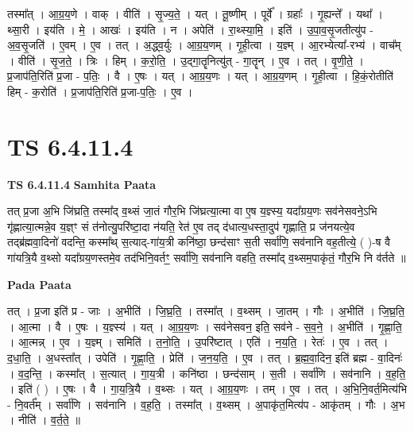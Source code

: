 \documentclass[17pt]{extarticle}
\begin{document}
तस्मा᳚त् । आ॒ग्र॒य॒णे । वाक् । वीति॑ । सृ॒ज्य॒ते॒ । यत् । तू॒ष्णीम् । पूर्वे᳚ । ग्रहाः᳚ । गृ॒ह्यन्ते᳚ । यथा᳚ । थ्सा॒री । इय॑ति । मे॒ । आखः॑ । इय॑ति । न । अपेति॑ । रा॒थ्स्या॒मि॒ । इति॑ । उ॒पा॒व॒सृ॒जतीत्यु॑प - अ॒व॒सृ॒जति॑ । ए॒वम् । ए॒व । तत् । अ॒द्ध्व॒र्युः । आ॒ग्र॒य॒णम् । गृ॒ही॒त्वा । य॒ज्ञ्म् । आ॒रभ्येत्या᳚-रभ्य॑ । वाच᳚म् । वीति॑ । सृ॒ज॒ते॒ । त्रिः । हिम् । क॒रो॒ति॒ । उ॒द्गा॒तॄनित्यु॑त् - गा॒तॄन् । ए॒व । तत् । वृ॒णी॒ते॒ । प्र॒जाप॑ति॒रिति॑ प्र॒जा - प॒तिः॒ । वै । ए॒षः । यत् । आ॒ग्र॒य॒णः । यत् । आ॒ग्र॒य॒णम् । गृ॒ही॒त्वा । हि॒कं॒रोतीति॑ हिम् - क॒रोति॑ । प्र॒जाप॑ति॒रिति॑ प्र॒जा-प॒तिः॒ । ए॒व ।  \newline




\section*{ TS 6.4.11.4 }

\textbf{TS 6.4.11.4 } \newline
\textbf{Samhita Paata} \newline

तत् प्र॒जा अ॒भि जि॑घ्रति॒ तस्मा᳚द् व॒थ्सं जा॒तं गौर॒भि जि॑घ्रत्या॒त्मा वा ए॒ष य॒ज्ञ्स्य॒ यदा᳚ग्रय॒णः सव॑नेसवने॒ऽभि गृ॑ह्णात्या॒त्मन्ने॒व य॒ज्ञ्ꣳ सं त॑नोत्यु॒परि॑ष्टा॒दा न॑यति॒ रेत॑ ए॒व तद् द॑धात्य॒धस्ता॒दुप॑ गृह्णाति॒ प्र ज॑नयत्ये॒व तद्ब्र॑ह्मवा॒दिनो॑ वदन्ति॒ कस्मा᳚थ् स॒त्याद्-गा॑य॒त्री कनि॑ष्ठा॒ छन्द॑साꣳ स॒ती सर्वा॑णि॒ सव॑नानि वह॒तीत्ये॒ ( )-ष वै गा॑यत्रि॒यै व॒थ्सो यदा᳚ग्रय॒णस्तमे॒व तद॑भिनि॒वर्तꣳ॒॒ सर्वा॑णि॒ सव॑नानि वहति॒ तस्मा᳚द् व॒थ्सम॒पाकृ॑तं॒ गौर॒भि नि व॑र्तते ॥ \newline

\textbf{Pada Paata} \newline

तत् । प्र॒जा इति॑ प्र - जाः । अ॒भीति॑ । जि॒घ्र॒ति॒ । तस्मा᳚त् । व॒थ्सम् । जा॒तम् । गौः । अ॒भीति॑ । जि॒घ्र॒ति॒ । आ॒त्मा । वै । ए॒षः । य॒ज्ञ्स्य॑ । यत् । आ॒ग्र॒य॒णः । सव॑नेसवन॒ इति॒ सव॑ने - स॒व॒ने॒ । अ॒भीति॑ । गृ॒ह्णा॒ति॒ । आ॒त्मन्न् । ए॒व । य॒ज्ञ्म् । समिति॑ । त॒नो॒ति॒ । उ॒परि॑ष्टात् । एति॑ । न॒य॒ति॒ । रेतः॑ । ए॒व । तत् । द॒धा॒ति॒ । अ॒धस्ता᳚त् । उपेति॑ । गृ॒ह्णा॒ति॒ । प्रेति॑ । ज॒न॒य॒ति॒ । ए॒व । तत् । ब्र॒ह्म॒वा॒दिन॒ इति॑ ब्रह्म - वा॒दिनः॑ । व॒द॒न्ति॒ । कस्मा᳚त् । स॒त्यात् । गा॒य॒त्री । कनि॑ष्ठा । छन्द॑साम् । स॒ती । सर्वा॑णि । सव॑नानि । व॒ह॒ति॒ । इति॑ ( ) । ए॒षः । वै । गा॒य॒त्रि॒यै । व॒थ्सः । यत् । आ॒ग्र॒य॒णः । तम् । ए॒व । तत् । अ॒भि॒नि॒वर्त॒मित्य॑भि - नि॒वर्त᳚म् । सर्वा॑णि । सव॑नानि । व॒ह॒ति॒ । तस्मा᳚त् । व॒थ्सम् । अ॒पाकृ॑त॒मित्य॑प - आकृ॑तम् । गौः । अ॒भ । नीति॑ । व॒र्त॒ते॒ ॥  \newline
\end{document}
